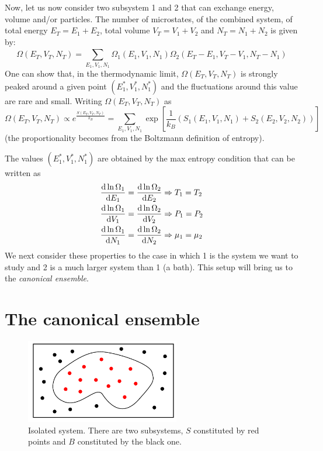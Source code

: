 \documentclass[../../Main/Main.tex]{subfiles}
\begin{document}
Now, let us now consider two subsystem 1 and 2 that can exchange energy, volume and/or particles.
The number of microstates, of the combined system, of total energy \( E_T = E_1 + E_2 \), total volume \( V_T = V_1 + V_2 \) and \( N_T = N_1 + N_2 \) is given by:
\begin{equation}
  \Omega (E_T,V_T,N_T) = \sum_{E_1,V_1,N_1}^{} \Omega _1 (E_1,V_1,N_1) \Omega _2 (E_T - E_1,V_T-V_1,N_T-N_1)
\end{equation}
One can show that, in the thermodynamic limit, \(  \Omega (E_T,V_T,N_T) \) is strongly peaked around a given point \( (E_1^*,V_1^*,N_1^*) \) and the fluctuations around this value are rare and small. Writing \( \Omega (E_T,V_T,N_T)  \) as
\begin{equation}
  \Omega (E_T,V_T,N_T) \propto e^{\frac{S(E_T,V_T,N_T) }{k_B}} = \sum_{E_1,V_1,N_1}^{} \exp[ \frac{1}{k_B} (S_1 (E_1,V_1, N_1) + S_2 (E_2,V_2, N_2) ) ]
\end{equation}
(the proportionality becomes from the Boltzmann definition of entropy).

The values \( (E_1^*,V_1^*,N_1^*) \) are obtained by the max entropy condition that can be written as
\begin{subequations}
\begin{align}
  \dv{\ln{\Omega _1} }{E_1}  &= \dv{\ln{\Omega _2} }{E_2} \Rightarrow  T_1 = T_2 \\
  \dv{\ln{\Omega _1} }{V_1}  &= \dv{\ln{\Omega _2} }{V_2} \Rightarrow  P_1 = P_2 \\
  \dv{\ln{\Omega _1} }{N_1}  &= \dv{\ln{\Omega _2} }{N_2} \Rightarrow  \mu _1 = \mu _2
\end{align}
\end{subequations}
We next consider these properties to the case in which 1 is the system we want to study and 2 is a much larger system than 1 (a bath). This setup will bring us to the \emph{canonical ensemble}.

\section{The canonical ensemble}

\begin{figure}[h!]
\centering
\includegraphics[width=0.6\textwidth]{./img/1.pdf}
\caption{\label{fig:4_1} Isolated system. There are two subsystems, \( S \)  constituted by red points and \( B \) constituted by the black one.}
\end{figure}
\end{document}
